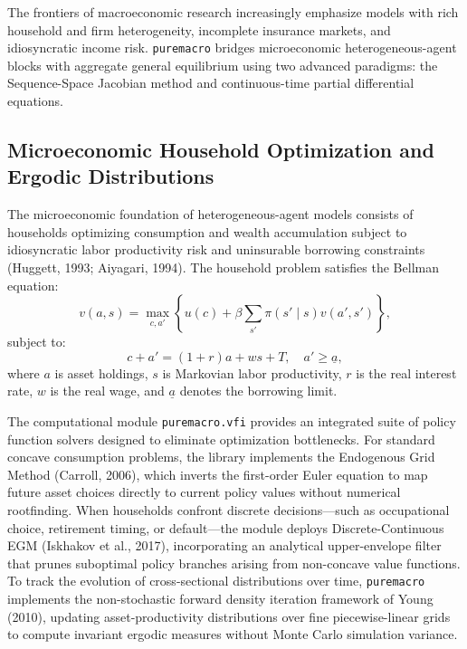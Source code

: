 \documentclass[11pt,letterpaper]{article}
\renewcommand{\_}{\pmunderscore\allowbreak}
\begin{document}
The frontiers of macroeconomic research increasingly emphasize models with rich household and firm heterogeneity, incomplete insurance markets, and idiosyncratic income risk. \texttt{puremacro} bridges microeconomic heterogeneous-agent blocks with aggregate general equilibrium using two advanced paradigms: the Sequence-Space Jacobian method and continuous-time partial differential equations.

\subsection{Microeconomic Household Optimization and Ergodic Distributions}\label{microeconomic-household-optimization-and-ergodic-distributions}

The microeconomic foundation of heterogeneous-agent models consists of households optimizing consumption and wealth accumulation subject to idiosyncratic labor productivity risk and uninsurable borrowing constraints (Huggett, 1993; Aiyagari, 1994). The household problem satisfies the Bellman equation:
\[v(a, s) = \max_{c, a'} \left\{ u(c) + \beta \sum_{s'} \pi(s' \mid s) v(a', s') \right\},\]
subject to:
\[c + a' = (1 + r) a + w s + T, \quad a' \ge \underline{a},\]
where \(a\) is asset holdings, \(s\) is Markovian labor productivity, \(r\) is the real interest rate, \(w\) is the real wage, and \(\underline{a}\) denotes the borrowing limit.

The computational module \texttt{puremacro.vfi} provides an integrated suite of policy function solvers designed to eliminate optimization bottlenecks. For standard concave consumption problems, the library implements the Endogenous Grid Method (Carroll, 2006), which inverts the first-order Euler equation to map future asset choices directly to current policy values without numerical rootfinding. When households confront discrete decisions---such as occupational choice, retirement timing, or default---the module deploys Discrete-Continuous EGM (Iskhakov et al., 2017), incorporating an analytical upper-envelope filter that prunes suboptimal policy branches arising from non-concave value functions. To track the evolution of cross-sectional distributions over time, \texttt{puremacro} implements the non-stochastic forward density iteration framework of Young (2010), updating asset-productivity distributions over fine piecewise-linear grids to compute invariant ergodic measures without Monte Carlo simulation variance.
\end{document}
